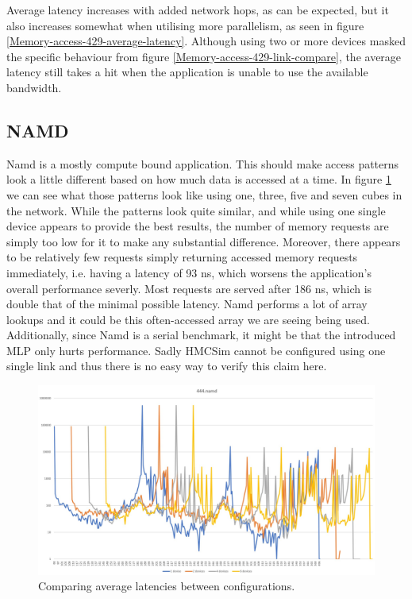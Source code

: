 Average latency increases with added network hops, as can be expected, but it also increases somewhat when utilising more parallelism, as seen in figure \ref{Memory-access-429-average-latency}. Although using two or more devices masked the specific behaviour from figure \ref{Memory-access-429-link-compare}, the average latency still takes a hit when the application is unable to use the available bandwidth.

\subsection{NAMD}
Namd is a mostly compute bound application. This should make access patterns look a little different based on how much data is accessed at a time. In figure \ref{Memory-access-444} we can see what those patterns look like using one, three, five and seven cubes in the network. While the patterns look quite similar, and while using one single device appears to provide the best results, the number of memory requests are simply too low for it to make any substantial difference. Moreover, there appears to be relatively few requests simply returning accessed memory requests immediately, i.e. having a latency of 93 ns, which worsens the application's overall performance severly. Most requests are served after 186 ns, which is double that of the minimal possible latency. Namd performs a lot of array lookups and it could be this often-accessed array we are seeing being used. Additionally, since Namd is a serial benchmark, it might be that the introduced MLP only hurts performance. Sadly HMCSim cannot be configured using one single link and thus there is no easy way to verify this claim here.

\begin{figure}[!ht]
    \centering
    \includegraphics[width=1\linewidth]{figure/444-x_4-1.jpg}
    \caption{Comparing average latencies between configurations.}
    \label{Memory-access-444}
\end{figure}


